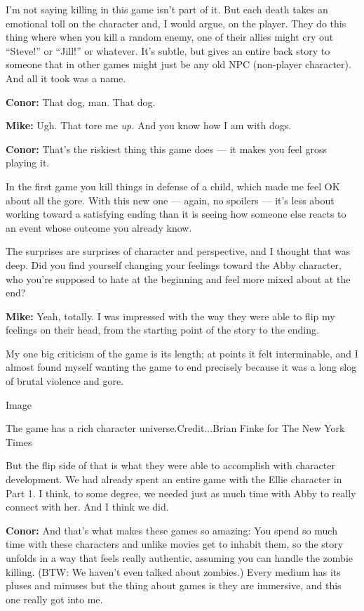 I'm not saying killing in this game isn't part of it. But each death
takes an emotional toll on the character and, I would argue, on the
player. They do this thing where when you kill a random enemy, one of
their allies might cry out ``Steve!'' or ``Jill!'' or whatever. It's
subtle, but gives an entire back story to someone that in other games
might just be any old NPC (non-player character). And all it took was a
name.

\textbf{Conor:} That dog, man. That dog.

\textbf{Mike:} Ugh. That tore me \emph{up.} And you know how I am with
dogs.

\textbf{Conor:} That's the riskiest thing this game does --- it makes
you feel gross playing it.

In the first game you kill things in defense of a child, which made me
feel OK about all the gore. With this new one --- again, no spoilers ---
it's less about working toward a satisfying ending than it is seeing how
someone else reacts to an event whose outcome you already know.

The surprises are surprises of character and perspective, and I thought
that was deep. Did you find yourself changing your feelings toward the
Abby character, who you're supposed to hate at the beginning and feel
more mixed about at the end?

\textbf{Mike:} Yeah, totally. I was impressed with the way they were
able to flip my feelings on their head, from the starting point of the
story to the ending.

My one big criticism of the game is its length; at points it felt
interminable, and I almost found myself wanting the game to end
precisely because it was a long slog of brutal violence and gore.

Image

The game has a rich character universe.Credit...Brian Finke for The New
York Times

But the flip side of that is what they were able to accomplish with
character development. We had already spent an entire game with the
Ellie character in Part 1. I think, to some degree, we needed just as
much time with Abby to really connect with her. And I think we did.

\textbf{Conor:} And that's what makes these games so amazing: You spend
so much time with these characters and unlike movies get to inhabit
them, so the story unfolds in a way that feels really authentic,
assuming you can handle the zombie killing. (BTW: We haven't even talked
about zombies.) Every medium has its pluses and minuses but the thing
about games is they are immersive, and this one really got into me.

